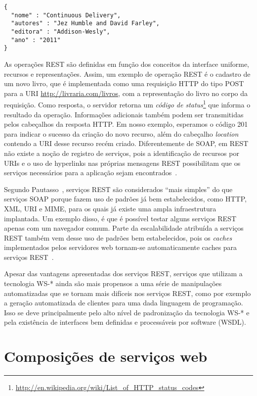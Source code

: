 \begin{lstlisting}[frame=trbl, label=lst:json, caption=Representação JSON do recurso /livros/2.]
{
  "nome" : "Continuous Delivery",
  "autores" : "Jez Humble and David Farley",
  "editora" : "Addison-Wesly",
  "ano" : "2011"
}
\end{lstlisting}

As operações REST são definidas em função dos conceitos da interface uniforme, recursos e representações. Assim, um exemplo de operação REST é o cadastro de um novo livro, que é implementada como uma requisição HTTP do tipo POST para a URI \url{http://livraria.com/livros}, com a representação do livro no corpo da requisição. Como resposta, o servidor retorna um \emph{código de status}\footnote{\url{http://en.wikipedia.org/wiki/List_of_HTTP_status_codes}} que informa o resultado da operação. 
Informações adicionais também podem ser transmitidas pelos cabeçalhos da resposta HTTP.
Em nosso exemplo, esperamos o código 201 para indicar o sucesso da criação do novo recurso, além do cabeçalho \emph{location} contendo a URI desse recurso recém criado.
Diferentemente de SOAP, em REST não existe a noção de registro de serviços, pois a identificação de recursos por URIs e o uso de hyperlinks nas próprias mensagens REST possibilitam que os serviços necessários para a aplicação sejam encontrados~\cite{Pautasso2008Restful}.

Segundo Pautasso~\cite{Pautasso2008Restful}, serviços REST são considerados ``mais simples'' do que serviços SOAP porque fazem uso de padrões já bem estabelecidos, como HTTP, XML, URI e MIME, para os quais já existe uma ampla infraestrutura implantada. Um exemplo disso, é que é possível testar alguns serviços REST apenas com um navegador comum. Parte da escalabilidade atribuída a serviços REST também vem desse uso de padrões bem estabelecidos, pois os \emph{caches} implementados pelos servidores web tornam-se automaticamente caches para serviços REST~\cite{Tong2010CXF}.

Apesar das vantagens apresentadas dos serviços REST, serviços que utilizam a tecnologia WS-* ainda são mais propensos a uma série de manipulações automatizadas que se tornam mais difíceis nos serviços REST, como por exemplo a geração automatizada de clientes para uma dada linguagem de programação. Isso se deve principalmente pelo alto nível de padronização da tecnologia WS-* e pela existência de interfaces bem definidas e processáveis por software (WSDL). 

\section{Composições de serviços web}
\label{sec:composicoes}

